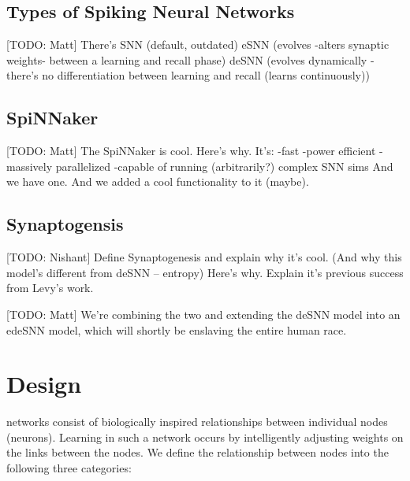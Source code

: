 \documentclass[journal]{./sty/IEEEtran}
\begin{document}
\subsection{Types of Spiking Neural Networks}
[TODO: Matt]
There's SNN (default, outdated)
eSNN (evolves -alters synaptic weights- between a learning and recall phase)
deSNN (evolves dynamically - there's no differentiation between learning and recall (learns continuously))

\subsection{SpiNNaker}
[TODO: Matt]
The SpiNNaker is cool. 
Here's why. It's:
 -fast
 -power efficient
 -massively parallelized
 -capable of running (arbitrarily?) complex SNN sims
And we have one. 
And we added a cool functionality to it (maybe). 

\subsection{Synaptogensis}
[TODO: Nishant]
Define Synaptogenesis and explain why it's cool. (And why this model's different from deSNN -- entropy)
Here's why. 
Explain it's previous success from Levy's work.

\hfill

[TODO: Matt] We're combining the two and extending the deSNN model into an edeSNN model, which will shortly be enslaving the entire human race.


\section{Design}
 networks consist of biologically inspired relationships between individual nodes (neurons). Learning in such a network occurs by intelligently adjusting weights on the links between the nodes. We define the relationship between nodes into the following three categories:
\end{document}
